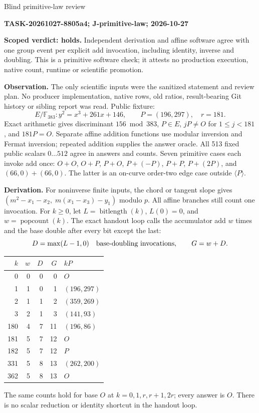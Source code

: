 \documentclass[10pt]{article}
\begin{document}
{\LARGE Blind primitive-law review}\par
\textbf{TASK-20261027-8805a4; J-primitive-law; 2026-10-27}

\textbf{Scoped verdict: holds.} Independent derivation and affine software agree with one group event per explicit add invocation, including identity, inverse and doubling. This is a primitive software check; it attests no production execution, native count, runtime or scientific promotion.

\textbf{Observation.} The only scientific inputs were the sanitized statement and review plan. No producer implementation, native rows, old ratios, result-bearing Git history or sibling report was read. Public fixture:
\[
 E/\mathbb{F}_{383}: y^2=x^3+261x+146,\qquad P=(196,297),\quad r=181.
\]
Exact arithmetic gives discriminant $156\bmod383$, $P\in E$, $jP\ne O$ for $1\le j<181$, and $181P=O$. Separate affine addition functions use modular inversion and Fermat inversion; repeated addition supplies the answer oracle. All 513 fixed public scalars $0\ldots512$ agree in answers and counts. Seven primitive cases each invoke add once: $O+O$, $O+P$, $P+O$, $P+(-P)$, $P+P$, $P+(2P)$, and $(66,0)+(66,0)$. The latter is an on-curve order-two edge case outside $\langle P\rangle$.

\textbf{Derivation.} For noninverse finite inputs, the chord or tangent slope gives $(m^2-x_1-x_2,\;m(x_1-x_3)-y_1)$ modulo $p$. All affine branches still count one invocation. For $k\ge0$, let $L=\operatorname{bitlength}(k)$, $L(0)=0$, and $w=\operatorname{popcount}(k)$. The exact handout loop calls the accumulator add $w$ times and the base double after every bit except the last:
\[
 D=\max(L-1,0)\quad\hbox{base-doubling invocations},\qquad G=w+D.
\]
\begin{center}
\begin{tabular}{rrrrl}\toprule
$k$&$w$&$D$&$G$&$kP$\\\midrule
0&0&0&0&$O$\\
1&1&0&1&$(196,297)$\\
2&1&1&2&$(359,269)$\\
3&2&1&3&$(141,93)$\\
180&4&7&11&$(196,86)$\\
181&5&7&12&$O$\\
182&5&7&12&$P$\\
331&5&8&13&$(262,200)$\\
362&5&8&13&$O$\\\bottomrule
\end{tabular}
\end{center}
The same counts hold for base $O$ at $k=0,1,r,r+1,2r$; every answer is $O$. There is no scalar reduction or identity shortcut in the handout loop.
\end{document}

